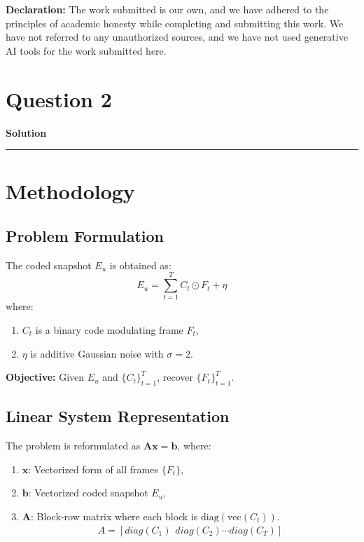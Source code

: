 \documentclass[a4paper,12pt]{article}
\title{\cooltitle{CS754 Assignment-3}}
\author{{\bf Saksham Rathi, Ekansh Ravi Shankar, Kshitij Vaidya}}
\date{}
\newenvironment{solution}[2][]{%
    \begin{mdframed}[linecolor=blue!70!black, linewidth=2pt, roundcorner=10pt, backgroundcolor=yellow!10!white, skipabove=12pt, skipbelow=12pt]%
        \textbf{\large #2}
        \par\noindent\rule{\textwidth}{0.4pt}
}{
    \end{mdframed}
}
\begin{document}
\maketitle
\textbf{Declaration:} The work submitted is our own, and
we have adhered to the principles of academic honesty while completing and submitting this work. We have not referred to any unauthorized sources, and we have not used generative AI tools for the work submitted here.

\section*{Question 2}

\begin{solution}{Solution}

\section{Methodology}

\subsection{Problem Formulation}
The coded snapshot $E_u$ is obtained as:
\[
E_u = \sum_{t=1}^{T} C_t \odot F_t + \eta
\]
where:
\begin{enumerate}
    \item $C_t$ is a binary code modulating frame $F_t$,
    \item $\eta$ is additive Gaussian noise with $\sigma = 2$.
\end{enumerate}

\textbf{Objective:} Given $E_u$ and $\{C_t\}_{t=1}^T$, recover $\{F_t\}_{t=1}^T$.

\subsection{Linear System Representation}
The problem is reformulated as $\mathbf{Ax} = \mathbf{b}$, where:
\begin{enumerate}
    \item $\mathbf{x}$: Vectorized form of all frames $\{F_t\}$,
    \item $\mathbf{b}$: Vectorized coded snapshot $E_u$,
    \item $\mathbf{A}$: Block-row matrix where each block is $\text{diag}(\text{vec}(C_t))$.
    \begin{align}
        A = [diag(C_1) \hspace{5pt} diag(C_2) \cdots diag(C_T)]
    \end{align}
\end{enumerate}


\end{solution}
\end{document}
